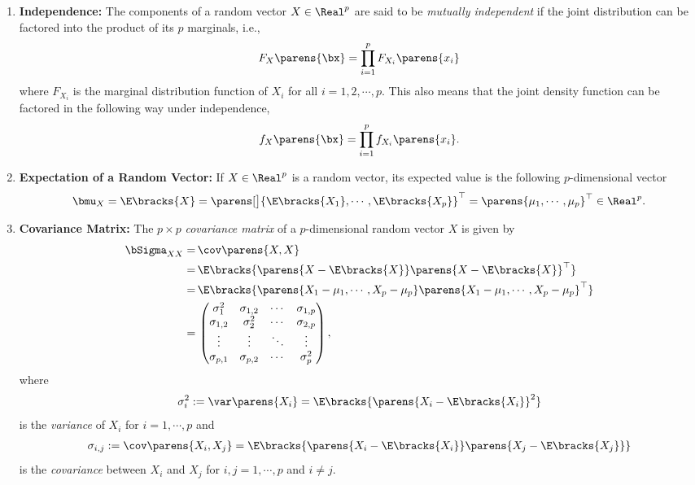 \documentclass[12pt]{article}
\begin{document}
\begin{enumerate}[label=\textbf{\arabic*.}]
	\item \textbf{Independence:} The components of a random vector $X \in \Real^p$ are said to be \textit{mutually independent} if the joint distribution can be factored into the product of its $p$ marginals, i.e., 
	\begin{align*}
		F_{X} \parens{\bx} = \prod_{i=1}^p F_{X_i} \parens{x_i}
	\end{align*}
	where $F_{X_i}$ is the marginal distribution function of $X_i$ for all $i = 1, 2, \cdots, p$. This also means that the joint density function can be factored in the following way under independence, 
	\begin{align*}
		f_{X} \parens{\bx} = \prod_{i=1}^p f_{X_i} \parens{x_i}. 
	\end{align*}
	
	\item \textbf{Expectation of a Random Vector:} If $X \in \Real^p$ is a random vector, its expected value is the following $p$-dimensional vector 
	\begin{align*}
		\bmu_X = \E \bracks{X} = \parens[\big]{\E \bracks{X_1}, \cdots, \E \bracks{X_p}}^\top = \parens{\mu_1, \cdots, \mu_p}^\top \in \Real^p. 
	\end{align*}
	
	\item \textbf{Covariance Matrix:} The $p \times p$ \textit{covariance matrix} of a $p$-dimensional random vector $X$ is given by 
	\begin{align*}
		\bSigma_{XX} = & \, \cov \parens{X, X} \\ 
		= & \, \E \bracks{ \parens{X - \E \bracks{X}} \parens{X - \E \bracks{X}}^\top} \\ 
		= & \, \E \bracks{ \parens{X_1 - \mu_1, \cdots, X_p - \mu_p} \parens{X_1 - \mu_1, \cdots, X_p - \mu_p}^\top} \\ 
		= & \, \begin{pmatrix}
			\sigma_1^2 & \sigma_{1,2} & \cdots & \sigma_{1,p} \\ 
			\sigma_{1,2} & \sigma_{2}^2 & \cdots & \sigma_{2,p} \\ 
			\vdots & \vdots & \ddots & \vdots \\ 
			\sigma_{p,1} & \sigma_{p,2} & \cdots & \sigma^2_{p}
		\end{pmatrix}, 
	\end{align*}
	where 
	\begin{align*}
		\sigma_i^2 := \var \parens{X_i} = \E \bracks{ \parens{X_i - \E \bracks{X_i}}^2}
	\end{align*}
	is the \textit{variance} of $X_i$ for $i = 1, \cdots, p$ and 
	\begin{align*}
		\sigma_{i,j} := \cov \parens{X_i, X_j} = \E \bracks{ \parens{X_i - \E \bracks{X_i}} \parens{X_j - \E \bracks{X_j}}}
	\end{align*}
	is the \textit{covariance} between $X_i$ and $X_j$ for $i, j = 1, \cdots, p$ and $i \ne j$. 
	

\end{enumerate}
\end{document}
